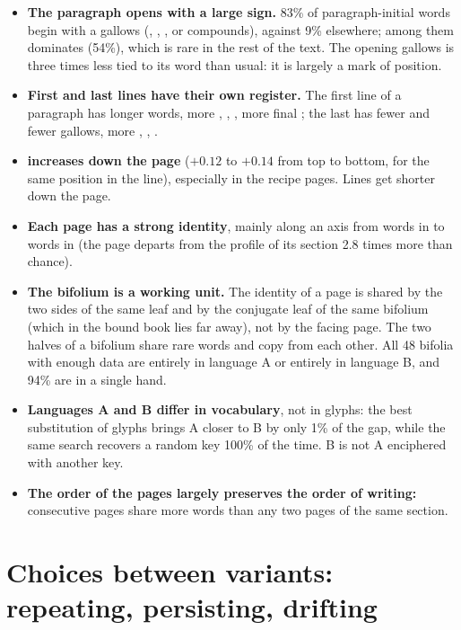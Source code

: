 \begin{itemize}
\item \textbf{The paragraph opens with a large sign.} 83\% of paragraph-initial words begin with a gallows (,
  , ,  or compounds), against 9\% elsewhere; among them  dominates (54\%), which is rare in the
  rest of the text. The opening gallows is three times less tied to its word than usual: it is largely a mark of position.
\item \textbf{First and last lines have their own register.} The first line of a paragraph has longer words, more
  , , , more final ; the last has fewer  and fewer gallows, more ,
  , .
\item \textbf{ increases down the page} ($+0.12$ to $+0.14$ from top to bottom, for the same position in the
  line), especially in the recipe pages. Lines get shorter down the page.
\item \textbf{Each page has a strong identity}, mainly along an axis from words in  to words in
   (the page departs from the profile of its section 2.8 times more than chance).
\item \textbf{The bifolium is a working unit.} The identity of a page is shared by the two sides of the same leaf and by
  the conjugate leaf of the same bifolium (which in the bound book lies far away), not by the facing page. The two halves
  of a bifolium share rare words and copy from each other. All 48 bifolia with enough data are entirely in language A or
  entirely in language B, and 94\% are in a single hand.
\item \textbf{Languages A and B differ in vocabulary}, not in glyphs: the best substitution of glyphs brings A closer to B
  by only 1\% of the gap, while the same search recovers a random key 100\% of the time. B is not A enciphered with
  another key.
\item \textbf{The order of the pages largely preserves the order of writing:} consecutive pages share more words than any
  two pages of the same section.
\end{itemize}

\section{Choices between variants: repeating, persisting, drifting}

